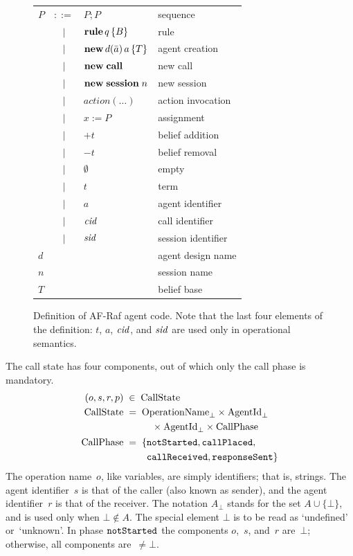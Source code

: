 \documentclass[a4paper,12pt,oneside,fleqn]{book} %
\begin{document}
\begin{figure} %
\begin{center}
\begin{tabular}{lcll}
  $P$ & $::=$ & $P;P$ & sequence
  \\  & $\mid$ & ${\bf rule}\,q\,\{B\}$ & rule 
  \\  & $\mid$ & ${\bf new}\,d(\bar{a})\,a\,\{T\}$ & agent creation
  \\  & $\mid$ & ${\bf new }\;{\bf call}$ & new call 
  \\  & $\mid$ & ${\bf new}\;{\bf session}\;n$ & new session
  \\  & $\mid$ & $action(\ldots)$ & action invocation
  \\  & $\mid$ & $x:=P$ & assignment
  \\  & $\mid$ & $+t$ & belief addition 
  \\  & $\mid$ & $-t$ & belief removal
  \\  & $\mid$ & $\emptyset$  & empty
  \\  & $\mid$ & $t$ & term 
  \\  & $\mid$ & $a$ & agent identifier
  \\  & $\mid$ & ${\it cid}$ & call identifier
  \\  & $\mid$ & ${\it sid}$ & session identifier
  \\
  $d$ & & & agent design name
  \\
  $n$ & & & session name
  \\
  $T$ & & & belief base
\end{tabular}
\end{center}
\caption{
Definition of AF-Raf agent code. Note that the last four elements of the
definition: $t$, $a$, ${\it cid}$, and ${\it sid}$ are used only in
operational semantics.
}
\label{fig:agent-code}
\end{figure} %

The call state has four components, out of which only the call phase is
mandatory.
\begin{align}
(o,s,r,p) &\;\in\; {\rm CallState}
\\
{\rm CallState} &\;=\;
  \begin{aligned}[t]
  &{\rm OperationName}_\bot\times{\rm AgentId}_\bot \\
  &\quad\times{\rm AgentId}_\bot\times{\rm CallPhase}
  \end{aligned}
\\
{\rm CallPhase} &\;=\;
  \begin{aligned}[t]
  \{  &{\tt notStarted}, {\tt callPlaced},\\
      &{\tt callReceived}, {\tt responseSent} \}
  \end{aligned}
\end{align}
The operation name~$o$, like variables, are simply identifiers; that is,
strings. The agent identifier~$s$ is that of the caller (also known as
sender), and the agent identifier~$r$ is that of the receiver. The notation
$A_\bot$ stands for the set $A\cup\{\bot\}$, and is used only when
$\bot\notin A$. The special element $\bot$ is to be read as `undefined'
or~`unknown'. In phase ${\tt notStarted}$ the components $o$,~$s$, and~$r$
are~$\bot$; otherwise, all components are~$\ne\bot$.
\end{document}
